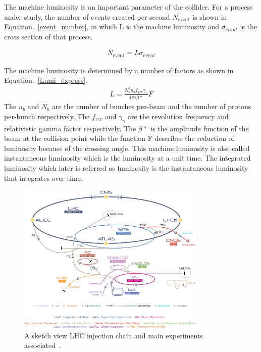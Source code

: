 The machine luminosity is an important parameter of the collider. For a process under study, the number of events created per-second $N_{\textrm{event}}$ is shown in Equation.~\ref{event_number}, in which L is the machine luminosity and $\sigma_{event}$ is the cross section of that process.

\begin{align}\label{event_number}
N_{\textrm{event}}=L\sigma_{event}
\end{align}

The machine luminosity is determined by a number of factors as shown in Equation.~\ref{Lumi_express}. 
\begin{align}\label{Lumi_express}
L=\frac{N_{b}^{2}n_{b}f_{fev}\gamma_{\gamma}}{4\pi\epsilon\beta*}F
\end{align}
The $n_b$ and $N_{b}$ are the number of bunches per-beam and the number of protons per-bunch respectively. The $f_{rev}$ and $\gamma_{\gamma}$ are the revolution frequency and relativistic gamma factor respectively. The $\beta*$ is the amplitude function of the beam at the collision point while the function F describes the reduction of luminosity because of the crossing angle. This machine luminosity is also called instantaneous luminosity which is the luminosity at a unit time. The integrated luminosity which later is referred as luminosity is the instantaneous luminosity that integrates over time.  



\begin{figure}[htbp] 
\centering
\includegraphics[width=0.8\textwidth]{chapter3/LHC_chain.jpg}
\caption[A sketch view LHC injection chain and main experiments associated]{A sketch view LHC injection chain and main experiments associated~\cite{Christiane:1260465}.}
\label{fig:LHC_sketch}
\end{figure}


